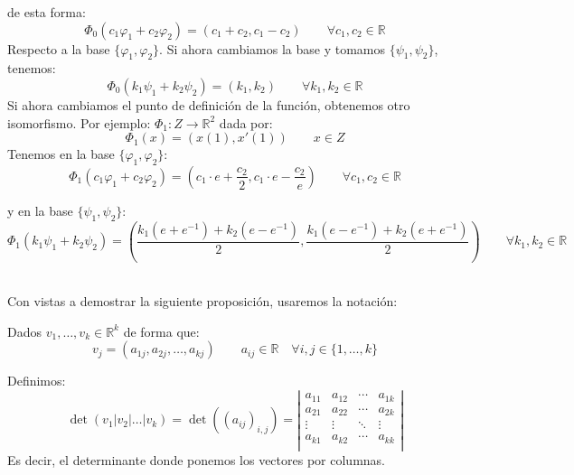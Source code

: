 \begin{ejemplo}
    de esta forma:
    \begin{equation*}
        \Phi_0(c_1\varphi_1 + c_2\varphi_2) = (c_1 + c_2, c_1 - c_2) \qquad \forall c_1,c_2\in \mathbb{R}
    \end{equation*}
    Respecto a la base $\{\varphi_1, \varphi_2\}$. Si ahora cambiamos la base y tomamos $\{\psi_1,\psi_2\}$, tenemos:
    \begin{equation*}
        \Phi_0(k_1\psi_1 + k_2\psi_2) = (k_1, k_2) \qquad \forall k_1,k_2\in \mathbb{R}
    \end{equation*}
    Si ahora cambiamos el punto de definición de la función, obtenemos otro isomorfismo. Por ejemplo: $\Phi_1:Z\rightarrow\mathbb{R}^2$ dada por:
    \begin{equation*}
        \Phi_1(x) = (x(1), x'(1)) \qquad x\in Z
    \end{equation*}
    Tenemos en la base $\{\varphi_1,\varphi_2\}$:
    \begin{equation*}
        \Phi_1(c_1\varphi_1+c_2\varphi_2) = \left(c_1\cdot e + \dfrac{c_2}{2}, c_1\cdot e - \dfrac{c_2}{e}\right) \qquad \forall c_1,c_2\in \mathbb{R}
    \end{equation*}

    y en la base $\{\psi_1,\psi_2\}$:
    \begin{equation*}
        \Phi_1(k_1\psi_1 + k_2\psi_2) = \left(\dfrac{k_1(e+e^{-1})+k_2(e-e^{-1})}{2}, \dfrac{k_1(e-e^{-1})+k_2(e+e^{-1})}{2}\right) \qquad \forall k_1,k_2\in \mathbb{R}
    \end{equation*}
\end{ejemplo}~\\

Con vistas a demostrar la siguiente proposición, usaremos la notación:
\begin{notacion}
    Dados $v_1,\ldots,v_k\in \mathbb{R}^k$ de forma que:
    \begin{equation*}
        v_j = (a_{1j}, a_{2j}, \ldots, a_{kj}) \qquad a_{ij}\in \mathbb{R} \quad \forall i,j\in \{1,\ldots,k\}
    \end{equation*}

    Definimos:
    \begin{equation*}
        \det(v_1|v_2|\ldots|v_k) = \det((a_{ij})_{i,j}) = \left|\begin{array}{cccc}
            a_{11} & a_{12} & \cdots & a_{1k} \\
            a_{21} & a_{22} & \cdots & a_{2k} \\
            \vdots & \vdots & \ddots & \vdots \\
            a_{k1} & a_{k2} & \cdots & a_{kk} \\
        \end{array}\right|
    \end{equation*}
    Es decir, el determinante donde ponemos los vectores por columnas.
\end{notacion}

